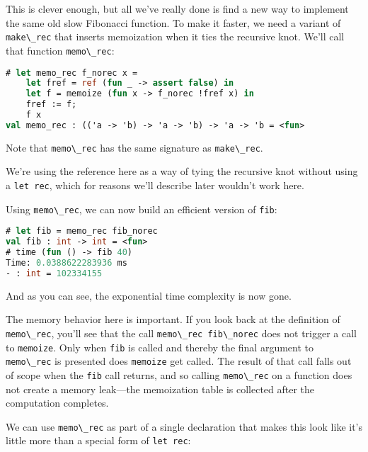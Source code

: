 This is clever enough, but all we've really done is find a new way to
implement the same old slow Fibonacci function. To make it faster, we
need a variant of \passthrough{\lstinline!make\_rec!} that inserts
memoization when it ties the recursive knot. We'll call that function
\passthrough{\lstinline!memo\_rec!}:

\begin{lstlisting}[language=Caml]
# let memo_rec f_norec x =
    let fref = ref (fun _ -> assert false) in
    let f = memoize (fun x -> f_norec !fref x) in
    fref := f;
    f x
val memo_rec : (('a -> 'b) -> 'a -> 'b) -> 'a -> 'b = <fun>
\end{lstlisting}

Note that \passthrough{\lstinline!memo\_rec!} has the same signature as
\passthrough{\lstinline!make\_rec!}.

We're using the reference here as a way of tying the recursive knot
without using a \passthrough{\lstinline!let rec!}, which for reasons
we'll describe later wouldn't work here.

Using \passthrough{\lstinline!memo\_rec!}, we can now build an efficient
version of \passthrough{\lstinline!fib!}:

\begin{lstlisting}[language=Caml]
# let fib = memo_rec fib_norec
val fib : int -> int = <fun>
# time (fun () -> fib 40)
Time: 0.0388622283936 ms
- : int = 102334155
\end{lstlisting}

And as you can see, the exponential time complexity is now gone.

The memory behavior here is important. If you look back at the
definition of \passthrough{\lstinline!memo\_rec!}, you'll see that the
call \passthrough{\lstinline!memo\_rec fib\_norec!} does not trigger a
call to \passthrough{\lstinline!memoize!}. Only when
\passthrough{\lstinline!fib!} is called and thereby the final argument
to \passthrough{\lstinline!memo\_rec!} is presented does
\passthrough{\lstinline!memoize!} get called. The result of that call
falls out of scope when the \passthrough{\lstinline!fib!} call returns,
and so calling \passthrough{\lstinline!memo\_rec!} on a function does
not create a memory leak---the memoization table is collected after the
computation completes.

We can use \passthrough{\lstinline!memo\_rec!} as part of a single
declaration that makes this look like it's little more than a special
form of \passthrough{\lstinline!let rec!}:

